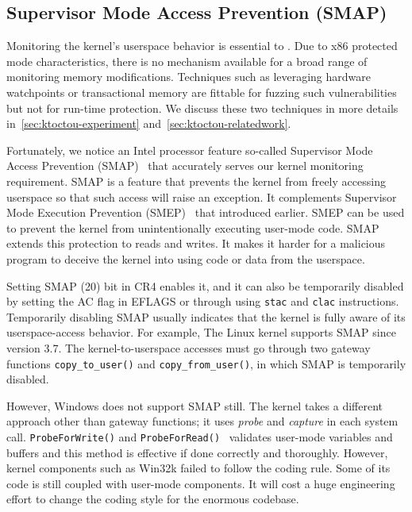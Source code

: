 
\subsection{Supervisor Mode Access Prevention (SMAP)}

Monitoring the kernel's userspace behavior is essential to \name. Due to x86 protected mode characteristics, there is no mechanism available for a broad range of monitoring memory modifications. Techniques such as leveraging hardware watchpoints or transactional memory are fittable for fuzzing such vulnerabilities but not for run-time protection. We discuss these two techniques in more details in~\autoref{sec:ktoctou-experiment} and~\autoref{sec:ktoctou-relatedwork}.

Fortunately, we notice an Intel processor feature so-called Supervisor Mode Access Prevention (SMAP)~\cite{corbet2012supervisorsmap} that accurately serves our kernel monitoring requirement.
SMAP is a feature that prevents the kernel from freely accessing userspace so that such access will raise an exception. It complements Supervisor Mode Execution Prevention (SMEP)~\cite{fischer2011supervisor} that introduced earlier. SMEP can be used to prevent the kernel from unintentionally executing user-mode code. SMAP extends this protection to reads and writes. It makes it harder for a malicious program to deceive the kernel into using code or data from the userspace.

Setting SMAP (20) bit in CR4 enables it, and it can also be temporarily disabled by setting the AC flag in EFLAGS or through using \texttt{stac} and \texttt{clac} instructions. Temporarily disabling SMAP usually indicates that the kernel is fully aware of its userspace-access behavior. For example, The Linux kernel supports SMAP since version 3.7. The kernel-to-userspace accesses must go through two gateway functions \texttt{copy\_to\_user()} and \texttt{copy\_from\_user()}, in which SMAP is temporarily disabled.

However, Windows does not support SMAP still. The kernel takes a different approach other than gateway functions; it uses \textit{probe} and \textit{capture} in each system call. \texttt{ProbeForWrite()}  and \texttt{ProbeForRead()}~\cite{probeforread} validates user-mode variables and buffers and this method is effective if done correctly and thoroughly. However, kernel components such as Win32k failed to follow the coding rule.  Some of its code is still coupled with user-mode components. It will cost a huge engineering effort to change the coding style for the enormous codebase.


